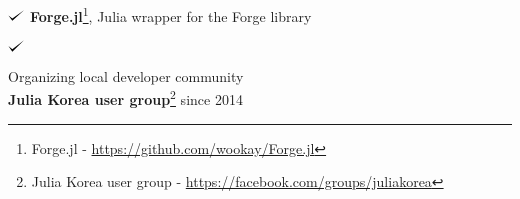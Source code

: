 \documentclass[margin,line]{res}
\def\checkmark{\tikz\fill[scale=0.4](0,.35) -- (.25,0) -- (1,.7) -- (.25,.15) -- cycle;}
\newenvironment{list1}{
  \begin{list}{$\checkmark$}{
      \setlength{\parsep}{0in} \setlength{\parskip}{0.3cm}
      \setlength{\topsep}{0in} \setlength{\partopsep}{0.3cm}
      \setlength{\leftmargin}{0.2in}}}{\end{list}}
\begin{document}
\begin{resume}
\begin{list1}
  {\bf Forge.jl}\footnote{ Forge.jl - \url{https://github.com/wookay/Forge.jl}}, Julia wrapper for the Forge library
\end{list1}

\begin{list1}
\item Organizing local developer community \\
  {\bf Julia Korea user group}\footnote{ Julia Korea user group - \url{https://facebook.com/groups/juliakorea}} since 2014
\end{list1}

\end{resume}
\end{document}
